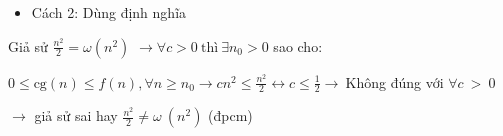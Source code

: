 \begin{itemize}
\item
  Cách 2: Dùng định nghĩa
\end{itemize}

Giả sử \(\frac{n^{2}}{2} = \omega\left( n^{2} \right)\)
\(\rightarrow \forall c > 0\ \text{thì}\ \exists n_{0} > 0\) sao cho:

\(0 \leq \text{cg}(n) \leq f(n),\forall n \geq n_{0} \rightarrow cn^{2} \leq \frac{n^{2}}{2} \leftrightarrow c \leq \frac{1}{2} \rightarrow \ \)Không
đúng với \(\forall c\  > \ 0\)

\(\rightarrow\) giả sử sai hay \(\frac{n^{2}}{2} \neq \omega\ (n^{2})\)
(đpcm)
